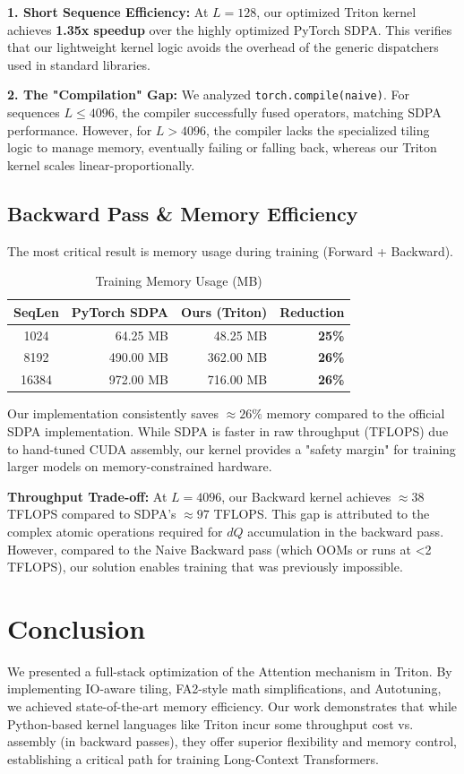 \documentclass[10pt,conference,letterpaper]{IEEEtran}
\begin{document}
\textbf{1. Short Sequence Efficiency:}
At $L=128$, our optimized Triton kernel achieves \textbf{1.35x speedup} over the highly optimized PyTorch SDPA. This verifies that our lightweight kernel logic avoids the overhead of the generic dispatchers used in standard libraries.

\textbf{2. The "Compilation" Gap:}
We analyzed \texttt{torch.compile(naive)}. For sequences $L \le 4096$, the compiler successfully fused operators, matching SDPA performance. However, for $L > 4096$, the compiler lacks the specialized tiling logic to manage memory, eventually failing or falling back, whereas our Triton kernel scales linear-proportionally.

\subsection{Backward Pass \& Memory Efficiency}
The most critical result is memory usage during training (Forward + Backward).

\begin{table}[h]
\centering
\caption{Training Memory Usage (MB)}
\begin{tabular}{crrr}
\toprule
SeqLen & PyTorch SDPA & Ours (Triton) & \textbf{Reduction} \\
\midrule
1024   & 64.25 MB     & 48.25 MB      & \textbf{25\%} \\
8192   & 490.00 MB    & 362.00 MB     & \textbf{26\%} \\
16384  & 972.00 MB    & 716.00 MB     & \textbf{26\%} \\
\bottomrule
\end{tabular}
\end{table}

Our implementation consistently saves $\approx 26\%$ memory compared to the official SDPA implementation. While SDPA is faster in raw throughput (TFLOPS) due to hand-tuned CUDA assembly, our kernel provides a "safety margin" for training larger models on memory-constrained hardware.

\textbf{Throughput Trade-off:}
At $L=4096$, our Backward kernel achieves $\approx 38$ TFLOPS compared to SDPA's $\approx 97$ TFLOPS. This gap is attributed to the complex atomic operations required for $dQ$ accumulation in the backward pass. However, compared to the Naive Backward pass (which OOMs or runs at <2 TFLOPS), our solution enables training that was previously impossible.

\section{Conclusion}
We presented a full-stack optimization of the Attention mechanism in Triton. By implementing IO-aware tiling, FA2-style math simplifications, and Autotuning, we achieved state-of-the-art memory efficiency. Our work demonstrates that while Python-based kernel languages like Triton incur some throughput cost vs. assembly (in backward passes), they offer superior flexibility and memory control, establishing a critical path for training Long-Context Transformers.
\end{document}
